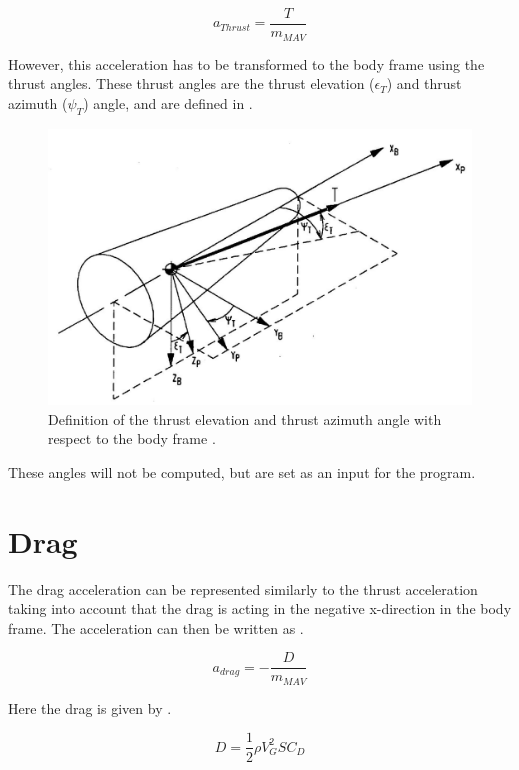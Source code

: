 \begin{equation} \label{eq:thrustModel}
a_{Thrust}=\dfrac{T}{m_{MAV}}
\end{equation}

\noindent
However, this acceleration has to be transformed to the body frame using the thrust angles. These thrust angles are the thrust elevation ($\epsilon_{T}$) and thrust azimuth ($\psi_{T}$) angle, and are defined in .

\begin{figure}[H]
\centering
\includegraphics[width=0.5 \textwidth]{figures/reference_frames/propframe_mooij1994motion.jpg}
\caption{Definition of the thrust elevation and thrust azimuth angle with respect to the body frame \citep{mooij1994motion}.}
\label{fig:propframe_mooij1994motion}
\end{figure}

\noindent
These angles will not be computed, but are set as an input for the program.


\section{Drag}
\label{sec:dragModel}
The drag acceleration can be represented similarly to the thrust acceleration taking into account that the drag is acting in the negative x-direction in the body frame. The acceleration can then be written as .

\begin{equation} \label{eq:dragModel}
a_{drag}=-\dfrac{D}{m_{MAV}}
\end{equation}


\noindent
Here the drag is given by .

\begin{equation} \label{eq:dragDragModel}
D=\dfrac{1}{2}\rho V_{G}^{2}SC_{D}
\end{equation}


